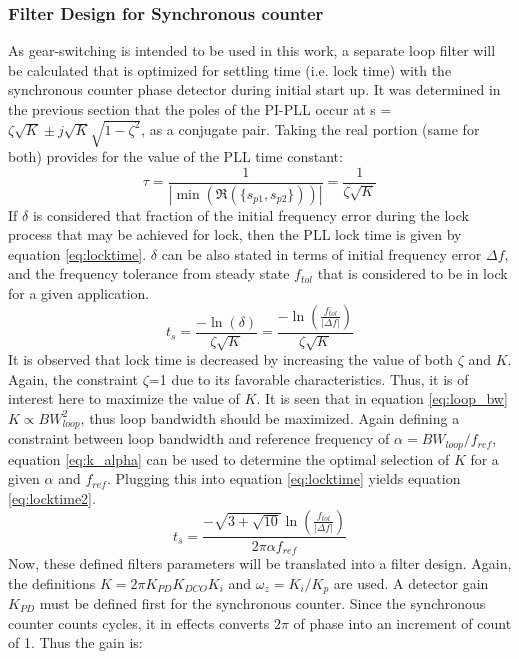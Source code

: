 		\subsubsection{Filter Design for Synchronous counter}
			As gear-switching is intended to be used in this work, a separate loop filter will be calculated that is optimized for settling time (i.e. lock time) with the synchronous counter phase detector during initial start up. It was determined in the previous section that the poles of the PI-PLL occur at s = $\zeta\sqrt{K} \pm j\sqrt{K}\sqrt{1-\zeta^2}$, as a conjugate pair. Taking the real portion (same for both) provides for the value of the PLL time constant:
			\begin{equation}
				\tau = \frac{1}{|\min(\Re(\{s_{p1}, s_{p2}\}))|} = \frac{1}{\zeta\sqrt{K}}
			\end{equation}
			If $\delta$ is considered that fraction of the initial frequency error during the lock process that may be achieved for lock, then the PLL lock time is given by equation \ref{eq:locktime}. $\delta$ can be also stated in terms of initial frequency error $\Delta f$, and the frequency tolerance from steady state $f_{tol}$ that is considered to be in lock for a given application.
			\begin{equation}\label{eq:locktime}
				t_s = \frac{-\ln(\delta)}{\zeta\sqrt{K}} = \frac{-\ln\left(\frac{f_{tol}}{|\Delta f|}\right)}{\zeta\sqrt{K}}
			\end{equation}
			It is observed that lock time is decreased by increasing the value of both $\zeta$ and $K$. Again, the constraint $\zeta$=1 due to its favorable characteristics. Thus, it is of interest here to maximize the value of $K$. It is seen that in equation \ref{eq:loop_bw} $K\propto BW_{loop}^2$, thus loop bandwidth should be maximized. Again defining a constraint between loop bandwidth and reference frequency of $\alpha = BW_{loop}/f_{ref}$, equation \ref{eq:k_alpha} can be used to determine the optimal selection of $K$ for a given $\alpha$ and $f_{ref}$. Plugging this into equation \ref{eq:locktime} yields equation \ref{eq:locktime2}.
			\begin{equation}\label{eq:locktime2}
				t_s =  \frac{-\sqrt{3+\sqrt{10}}\ln\left(\frac{f_{tol}}{|\Delta f|}\right)}{2\pi\alpha f_{ref}}
			\end{equation}
			Now, these defined filters parameters will be translated into a filter design. Again, the definitions $K=2\pi K_{PD}K_{DCO}K_{i}$ and $\omega_z = K_i/K_p$ are used. A detector gain $K_{PD}$ must be defined first for the synchronous counter. Since the synchronous counter counts cycles, it in effects converts $2\pi$ of phase into an increment of count of 1. Thus the gain is:
